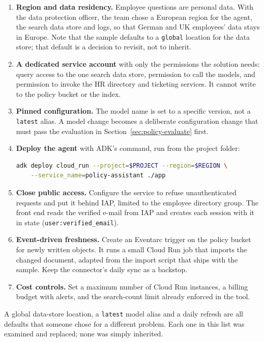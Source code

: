 \begin{enumerate}[itemsep=2pt]
  \item \textbf{Region and data residency.} Employee questions are personal data. With the data protection officer, the team chose a European region for the agent, the search data store and logs, so that German and UK employees' data stays in Europe. Note that the sample defaults to a \texttt{global} location for the data store; that default is a decision to revisit, not to inherit.
  \item \textbf{A dedicated service account} with only the permissions the solution needs: query access to the one search data store, permission to call the models, and permission to invoke the HR directory and ticketing services. It cannot write to the policy bucket or the index.
  \item \textbf{Pinned configuration.} The model name is set to a specific version, not a \texttt{latest} alias. A model change becomes a deliberate configuration change that must pass the evaluation in Section~\ref{sec:policy-evaluate} first.
  \item \textbf{Deploy the agent} with ADK's command, run from the project folder:
\begin{lstlisting}[language=bash, numbers=none]
adk deploy cloud_run --project=$PROJECT --region=$REGION \
    --service_name=policy-assistant ./app
\end{lstlisting}
  \item \textbf{Close public access.} Configure the service to refuse unauthenticated requests and put it behind IAP, limited to the employee directory group. The front end reads the verified e-mail from IAP and creates each session with it in state (\texttt{user:verified\_email}).
  \item \textbf{Event-driven freshness.} Create an Eventarc trigger on the policy bucket for newly written objects. It runs a small Cloud Run job that imports the changed document, adapted from the import script that ships with the sample. Keep the connector's daily sync as a backstop.
  \item \textbf{Cost controls.} Set a maximum number of Cloud Run instances, a billing budget with alerts, and the search-count limit already enforced in the tool.
\end{enumerate}

\begin{watchout}
A global data-store location, a \texttt{latest} model alias and a daily refresh are all defaults that someone chose for a different problem. Each one in this list was examined and replaced; none was simply inherited.
\end{watchout}

